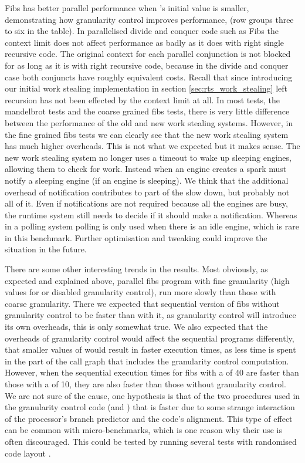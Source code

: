 Fibs has better parallel performance when \Depth's initial value is
smaller,
demonstrating how granularity control improves performance,
(row groups three to six in the table).
In parallelised divide and conquer code such as Fibs the context limit does
not affect performance as badly as it does with right
single recursive code.
The original context for each parallel conjunction is not blocked for as
long as it is with right recursive code,
because in the divide and conquer case both conjuncts have roughly
equivalent costs.
Recall that since introducing our initial work stealing implementation in
section \ref{sec:rts_work_stealing} left recursion has not been effected by
the context limit at all.
In most tests,
the mandelbrot tests and the coarse grained fibs tests,
there is very little difference between the performance of the old and new
work stealing systems.
However,
in the fine grained fibs tests we can clearly see that the new work stealing
system has much higher overheads.
This is not what we expected but it makes sense.
The new work stealing system no longer uses a timeout to wake up sleeping
engines, allowing them to check for work.
Instead when an engine creates a spark must notify a sleeping engine (if an
engine is sleeping).
We think that the additional overhead of notification contributes to part of
the slow down,
but probably not all of it.
Even if notifications are not required because all the engines are busy,
the runtime system still needs to decide if it should make a notification.
Whereas in a polling system polling is only used when there is an idle
engine, which is rare in this benchmark.
Further optimisation and tweaking could improve the situation in the future.


There are some other interesting trends in the results.
Most obviously,
as expected and explained above,
parallel fibs program with fine granularity
(high values for \Depth or disabled granularity control),
run more slowly than those with coarse granularity.
There we expected that sequential version of fibs without
granularity control to be faster than with it,
as granularity control will introduce its own overheads, this is only
somewhat true.
We also expected that the overheads of granularity control would affect the
sequential programs differently,
that smaller values of \Depth would result in faster execution times,
as less time is spent in the part of the call graph that includes the
granularity control computation.
However, when the sequential execution times for fibs with a \Depth of 40
are faster than those with a \Depth of 10,
they are also faster than those without granularity control.
We are not sure of the cause,
one hypothesis is that of the two procedures used in the granularity control
code (\fibsseq and \fibsgc) that \fibsgc is faster due to
some strange interaction of the processor's branch predictor and the code's
alignment.
This type of effect can be common with micro-benchmarks,
which is one reason why their use is often discouraged.
This could be tested by running several tests with randomised code layout
\citep{curtsinger:2012:stabelizer}.

